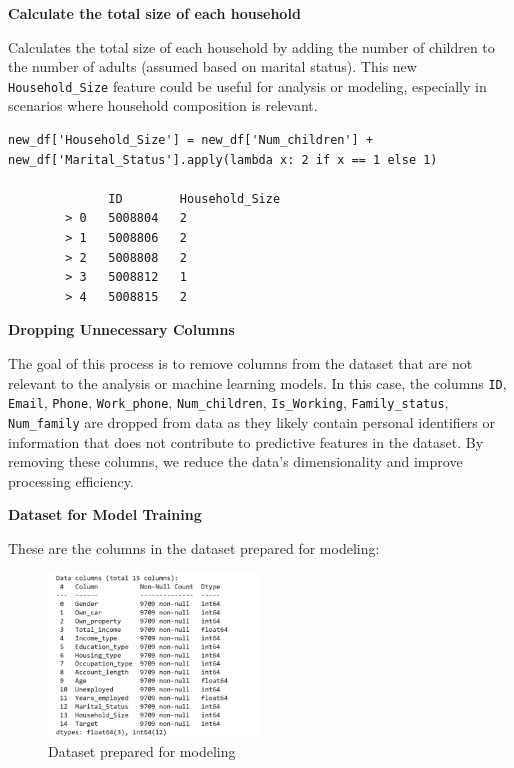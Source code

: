 \documentclass[12pt]{report}
\begin{document}
    {\bfseries Calculate the total size of each household}

    Calculates the total size of each household by adding the number of children to the number of adults (assumed based on marital status). This new \texttt{Household\_Size} feature could be useful for analysis or modeling, especially in scenarios where household composition is relevant.

    \begin{lstlisting}[style=default, language=python*, gobble=3]
        new_df['Household_Size'] = new_df['Num_children'] + new_df['Marital_Status'].apply(lambda x: 2 if x == 1 else 1)

              ID        Household_Size
        > 0   5008804   2
        > 1   5008806   2
        > 2   5008808   2
        > 3   5008812   1
        > 4   5008815   2
    \end{lstlisting}

    {\bfseries Dropping Unnecessary Columns}

    The goal of this process is to remove columns from the dataset that are not relevant to the analysis or machine learning models. In this case, the columns \texttt{ID}, \texttt{Email}, \texttt{Phone}, \texttt{Work\_phone}, \texttt{Num\_children}, \texttt{Is\_Working}, \texttt{Family\_status}, \texttt{Num\_family} are dropped from data as they likely contain personal identifiers or information that does not contribute to predictive features in the dataset. By removing these columns, we reduce the data's dimensionality and improve processing efficiency.

    {\bfseries Dataset for Model Training}

    These are the columns in the dataset prepared for modeling:

    \begin{figure}[h!]
        \centering
        \includegraphics[width=0.5\textwidth]{resources/pic/dataset prepared for modeling.png}
        \caption{Dataset prepared for modeling}
        \label{dataset prepared for modeling}
    \end{figure}
\end{document}
